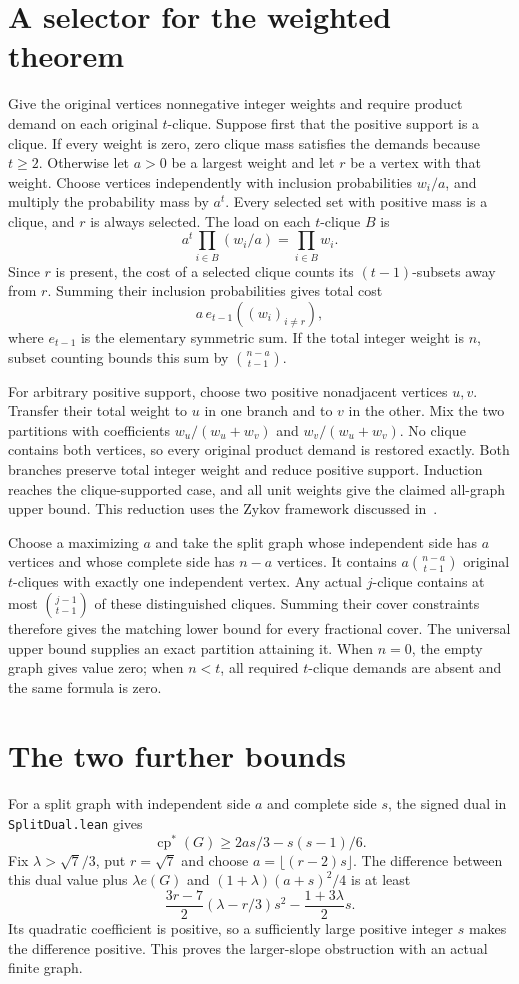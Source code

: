 \documentclass[11pt]{article}
\newcommand{\cp}{\operatorname{cp}}
\begin{document}
\section{A selector for the weighted theorem}
Give the original vertices nonnegative integer weights and require product demand on each original $t$-clique. Suppose first that the positive support is a clique. If every weight is zero, zero clique mass satisfies the demands because $t\geq2$. Otherwise let $a>0$ be a largest weight and let $r$ be a vertex with that weight. Choose vertices independently with inclusion probabilities $w_i/a$, and multiply the probability mass by $a^t$. Every selected set with positive mass is a clique, and $r$ is always selected. The load on each $t$-clique $B$ is
\[
 a^t\prod_{i\in B}(w_i/a)=\prod_{i\in B}w_i.
\]
Since $r$ is present, the cost of a selected clique counts its $(t-1)$-subsets away from $r$. Summing their inclusion probabilities gives total cost
\[
 a\,e_{t-1}((w_i)_{i\ne r}),
\]
where $e_{t-1}$ is the elementary symmetric sum. If the total integer weight is $n$, subset counting bounds this sum by $\binom{n-a}{t-1}$.

For arbitrary positive support, choose two positive nonadjacent vertices $u,v$. Transfer their total weight to $u$ in one branch and to $v$ in the other. Mix the two partitions with coefficients $w_u/(w_u+w_v)$ and $w_v/(w_u+w_v)$. No clique contains both vertices, so every original product demand is restored exactly. Both branches preserve total integer weight and reduce positive support. Induction reaches the clique-supported case, and all unit weights give the claimed all-graph upper bound. This reduction uses the Zykov framework discussed in~\cite{bhknw}.

Choose a maximizing $a$ and take the split graph whose independent side has $a$ vertices and whose complete side has $n-a$ vertices. It contains $a\binom{n-a}{t-1}$ original $t$-cliques with exactly one independent vertex. Any actual $j$-clique contains at most $\binom{j-1}{t-1}$ of these distinguished cliques. Summing their cover constraints therefore gives the matching lower bound for every fractional cover. The universal upper bound supplies an exact partition attaining it. When $n=0$, the empty graph gives value zero; when $n<t$, all required $t$-clique demands are absent and the same formula is zero.
\section{The two further bounds}
For a split graph with independent side $a$ and complete side $s$, the signed dual in \texttt{SplitDual.lean} gives
\[
 \cp^*(G)\geq 2as/3-s(s-1)/6.
\]
Fix $\lambda>\sqrt7/3$, put $r=\sqrt7$ and choose $a=\lfloor(r-2)s\rfloor$. The difference between this dual value plus $\lambda e(G)$ and $(1+\lambda)(a+s)^2/4$ is at least
\[
 \frac{3r-7}{2}(\lambda-r/3)s^2-\frac{1+3\lambda}{2}s.
\]
Its quadratic coefficient is positive, so a sufficiently large positive integer $s$ makes the difference positive. This proves the larger-slope obstruction with an actual finite graph.
\end{document}
